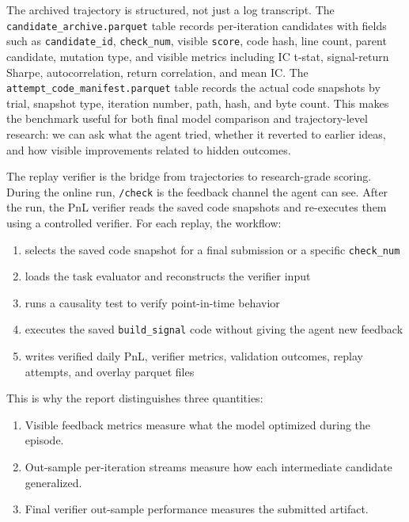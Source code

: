 \documentclass[
]{article}
\providecommand{\tightlist}{%
  \setlength{\itemsep}{0pt}\setlength{\parskip}{0pt}}
\begin{document}
The archived trajectory is structured, not just a log transcript. The \texttt{candidate\_archive.parquet} table records per-iteration candidates with fields such as \texttt{candidate\_id}, \texttt{check\_num}, visible \texttt{score}, code hash, line count, parent candidate, mutation type, and visible metrics including IC t-stat, signal-return Sharpe, autocorrelation, return correlation, and mean IC. The \texttt{attempt\_code\_manifest.parquet} table records the actual code snapshots by trial, snapshot type, iteration number, path, hash, and byte count. This makes the benchmark useful for both final model comparison and trajectory-level research: we can ask what the agent tried, whether it reverted to earlier ideas, and how visible improvements related to hidden outcomes.

The replay verifier is the bridge from trajectories to research-grade scoring. During the online run, \texttt{/check} is the feedback channel the agent can see. After the run, the PnL verifier reads the saved code snapshots and re-executes them using a controlled verifier. For each replay, the workflow:

\begin{enumerate}
\def\labelenumi{\arabic{enumi}.}
\tightlist
\item
  selects the saved code snapshot for a final submission or a specific \texttt{check\_num}
\item
  loads the task evaluator and reconstructs the verifier input
\item
  runs a causality test to verify point-in-time behavior
\item
  executes the saved \texttt{build\_signal} code without giving the agent new feedback
\item
  writes verified daily PnL, verifier metrics, validation outcomes, replay attempts, and overlay parquet files
\end{enumerate}

This is why the report distinguishes three quantities:

\begin{enumerate}
\def\labelenumi{\arabic{enumi}.}
\tightlist
\item
  Visible feedback metrics measure what the model optimized during the episode.
\item
  Out-sample per-iteration streams measure how each intermediate candidate generalized.
\item
  Final verifier out-sample performance measures the submitted artifact.
\end{enumerate}
\end{document}
